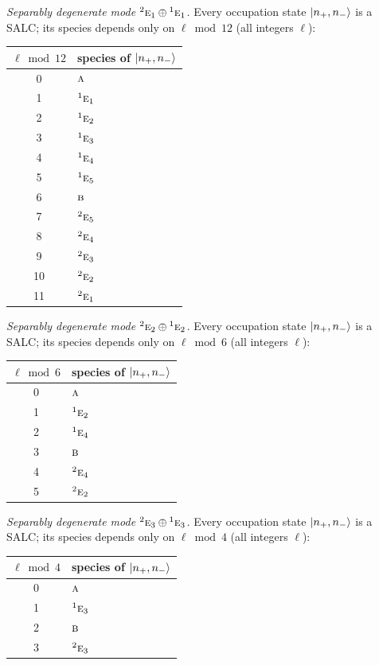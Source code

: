 \documentclass[11pt]{article}
\newcommand{\irr}[1]{\text{\normalfont\scshape #1}}
\newcommand{\conjpair}[1]{{}^{#1}}
\begin{document}
\emph{Separably degenerate mode $\conjpair{2}\irr{e}_{1}\oplus \conjpair{1}\irr{e}_{1}$.} Every occupation state $\ket{n_+,n_-}$ is a SALC; its species depends only on $\ell\bmod 12$ (all integers $\ell$):
\begin{longtable}{c l}\hline $\ell\bmod 12$ & species of $\ket{n_+,n_-}$\\ \hline\endhead
0 & $\irr{a}$\\
1 & $\conjpair{1}\irr{e}_{1}$\\
2 & $\conjpair{1}\irr{e}_{2}$\\
3 & $\conjpair{1}\irr{e}_{3}$\\
4 & $\conjpair{1}\irr{e}_{4}$\\
5 & $\conjpair{1}\irr{e}_{5}$\\
6 & $\irr{b}$\\
7 & $\conjpair{2}\irr{e}_{5}$\\
8 & $\conjpair{2}\irr{e}_{4}$\\
9 & $\conjpair{2}\irr{e}_{3}$\\
10 & $\conjpair{2}\irr{e}_{2}$\\
11 & $\conjpair{2}\irr{e}_{1}$\\
\hline\end{longtable}

\emph{Separably degenerate mode $\conjpair{2}\irr{e}_{2}\oplus \conjpair{1}\irr{e}_{2}$.} Every occupation state $\ket{n_+,n_-}$ is a SALC; its species depends only on $\ell\bmod 6$ (all integers $\ell$):
\begin{longtable}{c l}\hline $\ell\bmod 6$ & species of $\ket{n_+,n_-}$\\ \hline\endhead
0 & $\irr{a}$\\
1 & $\conjpair{1}\irr{e}_{2}$\\
2 & $\conjpair{1}\irr{e}_{4}$\\
3 & $\irr{b}$\\
4 & $\conjpair{2}\irr{e}_{4}$\\
5 & $\conjpair{2}\irr{e}_{2}$\\
\hline\end{longtable}

\emph{Separably degenerate mode $\conjpair{2}\irr{e}_{3}\oplus \conjpair{1}\irr{e}_{3}$.} Every occupation state $\ket{n_+,n_-}$ is a SALC; its species depends only on $\ell\bmod 4$ (all integers $\ell$):
\begin{longtable}{c l}\hline $\ell\bmod 4$ & species of $\ket{n_+,n_-}$\\ \hline\endhead
0 & $\irr{a}$\\
1 & $\conjpair{1}\irr{e}_{3}$\\
2 & $\irr{b}$\\
3 & $\conjpair{2}\irr{e}_{3}$\\
\hline\end{longtable}
\end{document}

